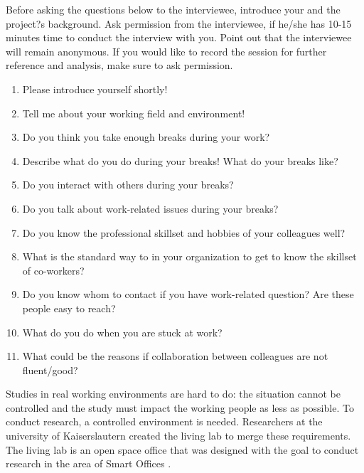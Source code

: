 \documentclass[english]{tktltiki}
\begin{document}
\pagebreak
\nocite{*}




\lastpage
\appendices
\pagestyle{empty}
\singlespacing

Before asking the questions below to the interviewee, introduce your and the project?s background. Ask permission from the interviewee, if he/she has 10-15 minutes time to conduct the interview with you. Point out that the interviewee will remain anonymous. If you would like to record the session for further reference and analysis, make sure to ask permission.

\begin{enumerate}
\item Please introduce yourself shortly!
\item Tell me about your working field and environment! 
\item Do you think you take enough breaks during your work? 
\item Describe what do you do during your breaks! What do your breaks like? 
\item Do you interact with others during your breaks? 
\item Do you talk about work-related issues during your breaks? 
\item Do you know the professional skillset and hobbies of your colleagues well?
\item What is the standard way to in your organization to get to know the skillset of co-workers? 
\item Do you know whom to contact if you have work-related question? Are these people easy to reach? 
\item What do you do when you are stuck at work? 
\item What could be the reasons if collaboration between colleagues are not fluent/good? 
\end{enumerate}

Studies in real working environments are hard to do: the situation cannot be controlled and the 
study must impact the working people as less as possible. To conduct research, a controlled 
environment is needed. Researchers at the university of Kaiserslautern created the living lab to 
merge these requirements. The living lab is an open space office that was designed with the goal to 
conduct research in the area of Smart Offices \cite{living-lab}.
\end{document}
